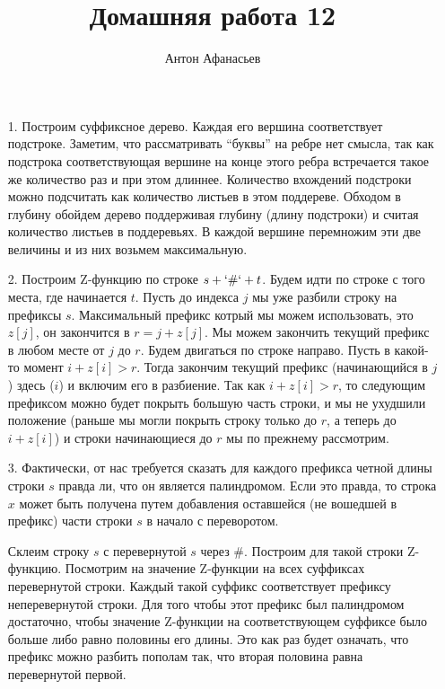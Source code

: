 \documentclass[10pt]{article}
\begin{document}
\title{Домашняя работа 12}
\author{Антон Афанасьев}
\maketitle

\begin{enumerate}
	\item[1.] Построим суффиксное дерево. Каждая его вершина соответствует подстроке. Заметим, что рассматривать ``буквы'' на ребре нет смысла, так как подстрока соответствующая вершине на конце этого ребра встречается такое же количество раз и при этом длиннее. Количество вхождений подстроки можно подсчитать как количество листьев в этом поддереве. Обходом в глубину обойдем дерево поддерживая глубину (длину подстроки) и считая количество листьев в поддеревьях. В каждой вершине перемножим эти две величины и из них возьмем максимальную.
	
	\item[2.] Построим Z-функцию по строке $s + `\#` + t$. Будем идти по строке с того места, где начинается $t$. Пусть до индекса $j$ мы уже разбили строку на префиксы $s$. Максимальный префикс котрый мы можем использовать, это $z[j]$, он закончится в $r = j + z[j]$. Мы можем закончить текущий префикс в любом месте от $j$ до $r$. Будем двигаться по строке направо. Пусть в какой-то момент $i + z[i] > r$. Тогда закончим текущий префикс (начинающийся в $j$) здесь ($i$) и включим его в разбиение. Так как $i+z[i] >r$, то следующим префиксом можно будет покрыть большую часть строки, и мы не ухудшили положение (раньше мы могли покрыть строку только до $r$, а теперь до $i+z[i]$) и строки начинающиеся до $r$ мы по прежнему рассмотрим. 
	
	\item[3.]  Фактически, от нас требуется сказать для каждого префикса четной длины строки $s$ правда ли, что он является палиндромом. Если это правда, то строка $x$ может быть получена путем добавления оставшейся (не вошедшей в префикс) части строки $s$ в начало с переворотом. 
	
	Склеим строку $s$ с перевернутой $s$ через \#. Построим для такой строки Z-функцию. Посмотрим на значение Z-функции на всех суффиксах перевернутой строки. Каждый такой суффикс соответствует префиксу неперевернутой строки. Для того чтобы этот префикс был палиндромом достаточно, чтобы значение Z-функции на соответствующем суффиксе было больше либо равно половины его длины. Это как раз будет означать, что префикс можно разбить пополам так, что вторая половина равна перевернутой первой.
		
\end{enumerate}
\end{document}
